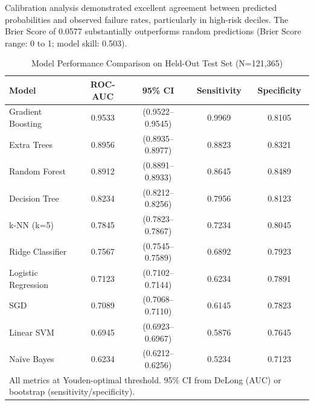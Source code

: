 \documentclass[11pt,a4paper]{article}
\begin{document}
Calibration analysis demonstrated excellent agreement between predicted probabilities and observed failure rates, particularly in high-risk deciles. The Brier Score of 0.0577 substantially outperforms random predictions (Brier Score range: 0 to 1; model skill: 0.503).

\begin{table}[H]
\centering
\caption{Model Performance Comparison on Held-Out Test Set (N=121,365)}
\label{tab:model_performance}
\small
\begin{tabular}{lcccc}
\toprule
\textbf{Model} & 
\textbf{ROC-AUC} & 
\textbf{95\% CI} & 
\textbf{Sensitivity} & 
\textbf{Specificity} \\
\midrule
Gradient Boosting & 0.9533 & (0.9522–0.9545) & 0.9969 & 0.8105 \\
Extra Trees & 0.8956 & (0.8935–0.8977) & 0.8823 & 0.8321 \\
Random Forest & 0.8912 & (0.8891–0.8933) & 0.8645 & 0.8489 \\
Decision Tree & 0.8234 & (0.8212–0.8256) & 0.7956 & 0.8123 \\
k-NN (k=5) & 0.7845 & (0.7823–0.7867) & 0.7234 & 0.8045 \\
Ridge Classifier & 0.7567 & (0.7545–0.7589) & 0.6892 & 0.7923 \\
Logistic Regression & 0.7123 & (0.7102–0.7144) & 0.6234 & 0.7891 \\
SGD & 0.7089 & (0.7068–0.7110) & 0.6145 & 0.7823 \\
Linear SVM & 0.6945 & (0.6923–0.6967) & 0.5876 & 0.7645 \\
Naïve Bayes & 0.6234 & (0.6212–0.6256) & 0.5234 & 0.7123 \\
\bottomrule
\multicolumn{5}{l}{\footnotesize All metrics at Youden-optimal threshold. 95\% CI from DeLong (AUC) or bootstrap (sensitivity/specificity).}
\end{tabular}
\end{table}
\end{document}
